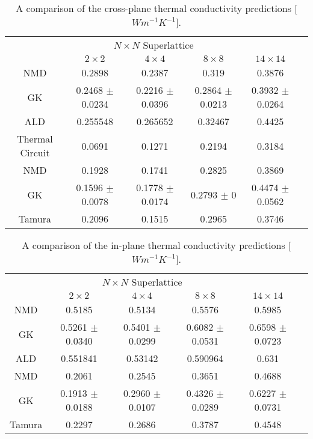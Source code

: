 \documentclass[aps,prb,preprint,preprintnumbers,amsmath,amssymb,floatfix,superscriptaddress]{revtex4}
\begin{document}
\begin{table}
\begin{center}
\begin{tabular*}{\textwidth}{c@{\extracolsep{\fill}}ccccc}
\hline\hline\noalign{\smallskip}
&\multicolumn{3}{c}{$N\times N$ Superlattice} \\
\cline{2-5}\noalign{\smallskip}
\hspace{1cm} & $2\times2$ & $4\times4$ & $8\times8$ & $14\times14$  \\
\noalign{\smallskip}\hline\noalign{\smallskip}
NMD &0.2898 & 0.2387 & 0.319 & 0.3876\\
GK & 0.2468 $\pm$ 0.0234 & 0.2216 $\pm$ 0.0396  &  0.2864 $\pm$ 0.0213  &  0.3932 $\pm$ 0.0264\\
ALD & 0.255548 &	0.265652  &	0.32467	 &0.4425\\
Thermal Circuit & 0.0691  &  0.1271  &  0.2194  &  0.3184\\
\noalign{\smallskip}\hline
NMD &0.1928 & 0.1741 & 0.2825 & 0.3869\\
GK  & 0.1596 $\pm$ 0.0078  &  0.1778 $\pm$ 0.0174 &  0.2793 $\pm$ 0 &   0.4474 $\pm$ 0.0562\\
Tamura & 0.2096 & 0.1515 & 0.2965 & 0.3746\\
\hline\hline
\end{tabular*}
\end{center}
\renewcommand{\table}{Table.}
\caption{A comparison of the cross-plane thermal conductivity predictions [$Wm^{-1}K^{-1}$].}
\label{TB:K_CP}
\end{table}

\begin{table}
\begin{center}
\begin{tabular*}{\textwidth}{c@{\extracolsep{\fill}}ccccc}
\hline\hline\noalign{\smallskip}
&\multicolumn{3}{c}{$N\times N$ Superlattice} \\
\cline{2-5}\noalign{\smallskip}
\hspace{1cm} & $2\times2$ & $4\times4$ & $8\times8$ & $14\times14$  \\
\noalign{\smallskip}\hline\noalign{\smallskip}
NMD &0.5185 & 0.5134 & 0.5576 & 0.5985\\
GK &0.5261 $\pm$ 0.0340 &  0.5401 $\pm$ 0.0299 &  0.6082 $\pm$ 0.0531  &  0.6598 $\pm$ 0.0723 \\
ALD & 0.551841	& 0.53142	&	0.590964	&0.631\\
\noalign{\smallskip}\hline
NMD &0.2061 & 0.2545 &	0.3651 & 0.4688\\
GK & 0.1913 $\pm$ 0.0188 &  0.2960 $\pm$ 0.0107  & 0.4326 $\pm$ 0.0289 &  0.6227 $\pm$ 0.0731 \\   
Tamura & 0.2297 & 0.2686 & 0.3787 &0.4548\\
\hline\hline
\end{tabular*}
\end{center}
\renewcommand{\table}{Table.}
\caption{A comparison of the in-plane thermal conductivity predictions [$Wm^{-1}K^{-1}$].}
\label{TB:K_IP}
\end{table}
\end{document}
